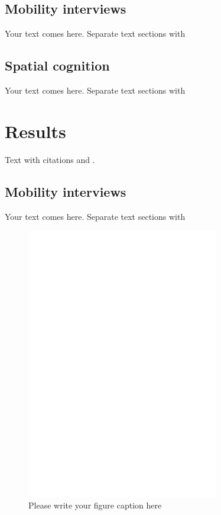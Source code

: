 	\subsection{Mobility interviews}
	\label{sec:2.1}
Your text comes here. Separate text sections with	
	\subsection{Spatial cognition}
	\label{sec:2.2}
Your text comes here. Separate text sections with

\section{Results}
\label{sec:3}
Text with citations \cite{RefB} and \cite{RefJ}.
	\subsection{Mobility interviews}
	\label{sec:3.1}
Your text comes here. Separate text sections with	

\begin{figure}
  \includegraphics[width=0.75\textwidth]{bfeed_mob}
\caption{Please write your figure caption here}
\label{fig:1}       %
\end{figure}

